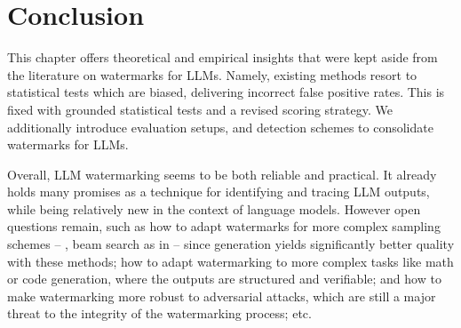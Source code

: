 \section{Conclusion}

This chapter offers theoretical and empirical insights that were kept aside from the literature on watermarks for LLMs.
Namely, existing methods resort to statistical tests which are biased, delivering incorrect false positive rates.
This is fixed with grounded statistical tests and a revised scoring strategy.
We additionally introduce evaluation setups, and detection schemes to consolidate watermarks for LLMs.

Overall, LLM watermarking seems to be both reliable and practical. 
It already holds many promises as a technique for identifying and tracing LLM outputs, while being relatively new in the context of language models. 
However open questions remain, such as how to adapt watermarks for more complex sampling schemes -- \eg, beam search as in \citep{kirchenbauer2023watermark} -- since generation yields significantly better quality with these methods; how to adapt watermarking to more complex tasks like math or code generation, where the outputs are structured and verifiable; and how to make watermarking more robust to adversarial attacks, which are still a major threat to the integrity of the watermarking process; etc.
